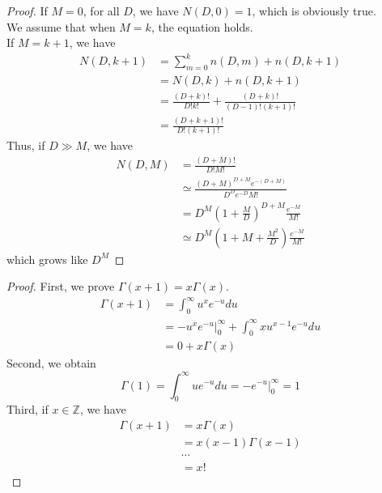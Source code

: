 \documentclass[12pt, a4paper]{article}
\newenvironment{exercise}[2][Ex]{\begin{trivlist}
\item[\hskip \labelsep {\bfseries #1}\hskip \labelsep {\bfseries #2.}]}{\end{trivlist}}
\begin{document}
\begin{exercise}{1.16(***)}
    \begin{proof}
        If $M=0$, for all $D$, we have $N(D,0)=1$, which is obviously true.\\
        We assume that when $M=k$, the equation holds.\\
        If $M=k+1$, we have
        \begin{align*}
            N(D,k+1)&=\sum_{m=0}^kn(D,m)+n(D,k+1)\\
            &=N(D,k)+n(D,k+1)\\
            &=\frac{(D+k)!}{D!k!}+\frac{(D+k)!}{(D-1)!(k+1)!}\\
            &=\frac{(D+k+1)!}{D!(k+1)!}
        \end{align*}
        Thus, if $D\gg M$, we have
        \begin{align*}
            N(D,M)&=\frac{(D+M)!}{D!M!}\\
            &\simeq \frac{(D+M)^{D+M}e^{-(D+M)}}{D^De^{-D}M!}\\
            &=D^M(1+\frac{M}{D})^{D+M}\frac{e^{-M}}{M!}\\
            &\simeq D^M(1+M+\frac{M^2}{D})\frac{e^{-M}}{M!}
        \end{align*}
        which grows like $D^M$
    \end{proof}
\end{exercise}
\begin{exercise}{1.17(**)}
    \begin{proof}
        First, we prove $\Gamma(x+1)=x\Gamma(x)$.
        \begin{align*}
            \Gamma(x+1)&=\int_0^\infty u^xe^{-u}du\\
            &=-u^xe^{-u}\Big\vert_0^\infty+\int_0^\infty xu^{x-1}e^{-u}du\\
            &=0+x\Gamma(x)
        \end{align*}
        Second, we obtain
        \[
            \Gamma(1)=\int_0^\infty ue^{-u}du=-e^{-u}\Big\vert_0^\infty=1
            \]
        Third, if $x\in \mathbb{Z}$, we have
        \begin{align*}
            \Gamma(x+1)&=x\Gamma(x)\\
            &=x(x-1)\Gamma(x-1)\\
            &\cdots\\
            &=x!
        \end{align*}
    \end{proof}
\end{exercise}
\end{document}
